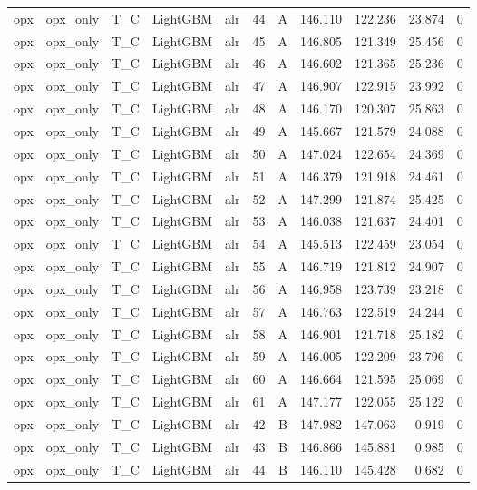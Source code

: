 \begin{longtable}{lllllrrrrrr}
opx & opx\_only & T\_C & LightGBM & alr & 44 & A & 146.110 & 122.236 & 23.874 & 0 \\
opx & opx\_only & T\_C & LightGBM & alr & 45 & A & 146.805 & 121.349 & 25.456 & 0 \\
opx & opx\_only & T\_C & LightGBM & alr & 46 & A & 146.602 & 121.365 & 25.236 & 0 \\
opx & opx\_only & T\_C & LightGBM & alr & 47 & A & 146.907 & 122.915 & 23.992 & 0 \\
opx & opx\_only & T\_C & LightGBM & alr & 48 & A & 146.170 & 120.307 & 25.863 & 0 \\
opx & opx\_only & T\_C & LightGBM & alr & 49 & A & 145.667 & 121.579 & 24.088 & 0 \\
opx & opx\_only & T\_C & LightGBM & alr & 50 & A & 147.024 & 122.654 & 24.369 & 0 \\
opx & opx\_only & T\_C & LightGBM & alr & 51 & A & 146.379 & 121.918 & 24.461 & 0 \\
opx & opx\_only & T\_C & LightGBM & alr & 52 & A & 147.299 & 121.874 & 25.425 & 0 \\
opx & opx\_only & T\_C & LightGBM & alr & 53 & A & 146.038 & 121.637 & 24.401 & 0 \\
opx & opx\_only & T\_C & LightGBM & alr & 54 & A & 145.513 & 122.459 & 23.054 & 0 \\
opx & opx\_only & T\_C & LightGBM & alr & 55 & A & 146.719 & 121.812 & 24.907 & 0 \\
opx & opx\_only & T\_C & LightGBM & alr & 56 & A & 146.958 & 123.739 & 23.218 & 0 \\
opx & opx\_only & T\_C & LightGBM & alr & 57 & A & 146.763 & 122.519 & 24.244 & 0 \\
opx & opx\_only & T\_C & LightGBM & alr & 58 & A & 146.901 & 121.718 & 25.182 & 0 \\
opx & opx\_only & T\_C & LightGBM & alr & 59 & A & 146.005 & 122.209 & 23.796 & 0 \\
opx & opx\_only & T\_C & LightGBM & alr & 60 & A & 146.664 & 121.595 & 25.069 & 0 \\
opx & opx\_only & T\_C & LightGBM & alr & 61 & A & 147.177 & 122.055 & 25.122 & 0 \\
opx & opx\_only & T\_C & LightGBM & alr & 42 & B & 147.982 & 147.063 & 0.919 & 0 \\
opx & opx\_only & T\_C & LightGBM & alr & 43 & B & 146.866 & 145.881 & 0.985 & 0 \\
opx & opx\_only & T\_C & LightGBM & alr & 44 & B & 146.110 & 145.428 & 0.682 & 0 \\

\end{longtable}
